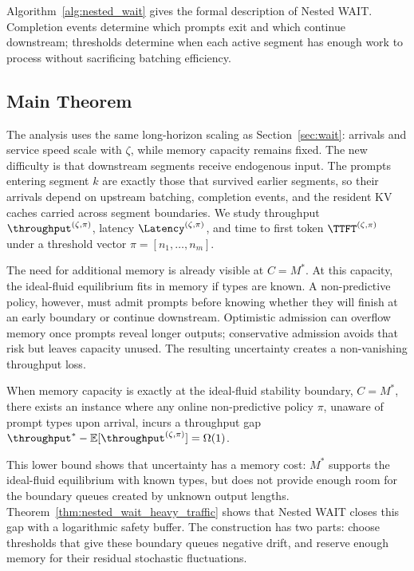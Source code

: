 Algorithm~\ref{alg:nested_wait} gives the formal description of Nested WAIT. Completion events determine which prompts exit and which continue downstream; thresholds determine when each active segment has enough work to process without sacrificing batching efficiency.

\subsection{Main Theorem}
\label{subsec:nested_main_theorem}

The analysis uses the same long-horizon scaling as Section~\ref{sec:wait}: arrivals and service speed scale with \(\zeta\), while memory capacity remains fixed. The new difficulty is that downstream segments receive endogenous input. The prompts entering segment \(k\) are exactly those that survived earlier segments, so their arrivals depend on upstream batching, completion events, and the resident KV caches carried across segment boundaries. We study throughput \(\throughput^{(\zeta,\pi)}\), latency \(\Latency^{(\zeta,\pi)}\), and time to first token \(\TTFT^{(\zeta,\pi)}\) under a threshold vector \(\pi=[n_1,\dots,n_m]\).

The need for additional memory is already visible at \(C=M^*\). At this capacity, the ideal-fluid equilibrium fits in memory if types are known. A non-predictive policy, however, must admit prompts before knowing whether they will finish at an early boundary or continue downstream. Optimistic admission can overflow memory once prompts reveal longer outputs; conservative admission avoids that risk but leaves capacity unused. The resulting uncertainty creates a non-vanishing throughput loss.

\begin{proposition}
\label{prop:unknown_lower_bound}
When memory capacity is exactly at the ideal-fluid stability boundary, \(C=M^*\), there exists an instance where any online non-predictive policy \( \pi \), unaware of prompt types upon arrival, incurs a throughput gap \( \throughput^* - \mathbb{E}[\throughput^{(\zeta, \pi)}] = \Omega(1) \).
\end{proposition}

This lower bound shows that uncertainty has a memory cost: \(M^*\) supports the ideal-fluid equilibrium with known types, but does not provide enough room for the boundary queues created by unknown output lengths. Theorem~\ref{thm:nested_wait_heavy_traffic} shows that Nested WAIT closes this gap with a logarithmic safety buffer. The construction has two parts: choose thresholds that give these boundary queues negative drift, and reserve enough memory for their residual stochastic fluctuations.

